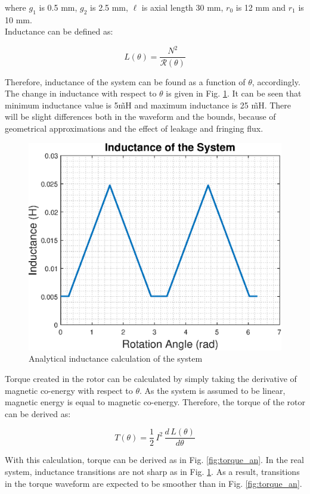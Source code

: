 \documentclass{reportClass}
\begin{document}
where $g_1$ is 0.5 mm, $g_2$ is 2.5 mm, $\ell$ is axial length 30 mm, $r_0$ is 12 mm and $r_1$ is 10 mm.\\

Inductance can be defined as:

$$
L(\theta) = \frac{N^2}{\mathcal{R}(\theta)}
$$

Therefore, inductance of the system can be found as a function of $\theta$, accordingly. The change in inductance with respect to $\theta$ is given in Fig. \ref{fig:ind_an}. It can be seen that minimum inductance value is 5\~mH and maximum inductance is 25 \~mH. There will be slight differences both in the waveform and the bounds, because of geometrical approximations and the effect of leakage and fringing flux.\\


\begin{figure}[h!]
\centering
\includegraphics[width=0.6\linewidth]{inductance_analytical.eps}
\caption{Analytical inductance calculation of the system}
\label{fig:ind_an}
\end{figure}


Torque created in the rotor can be calculated by simply taking the derivative of magnetic co-energy with respect to $\theta$. As the system is assumed to be linear, magnetic energy is equal to magnetic co-energy. Therefore, the torque of the rotor can be derived as:

$$
T(\theta) = \frac{1}{2}\,I^2\,\frac{d\,L(\theta)}{d\theta}
$$

With this calculation, torque can be derived as in Fig. \ref{fig:torque_an}. In the real system, inductance transitions are not sharp as in Fig. \ref{fig:ind_an}. As a result, transitions in the torque waveform are expected to be smoother than in Fig. \ref{fig:torque_an}.
\end{document}
